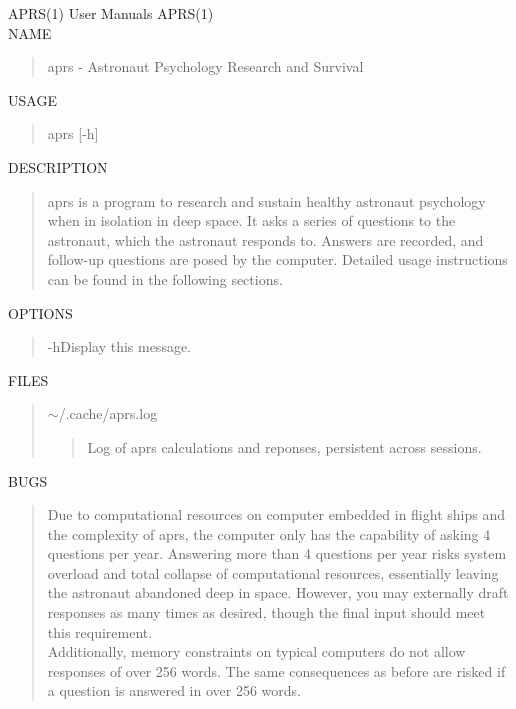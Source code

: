 \documentclass{article}
\begin{document}
\noindent APRS(1) \hfill User Manuals \hfill APRS(1) \\

NAME
\begin{quote}aprs - Astronaut Psychology Research and Survival\end{quote}

USAGE
\begin{quote}
aprs [-h]
\end{quote}

DESCRIPTION
\begin{quote}
  aprs is a program to research and sustain healthy astronaut psychology when in isolation in deep space. It asks a series of questions to the astronaut, which the astronaut responds to. Answers are recorded, and follow-up questions are posed by the computer. Detailed usage instructions can be found in the following sections.
\end{quote}

OPTIONS
\begin{quote}
  -h\qquad Display this message.
\end{quote}

FILES
\begin{quote}
  $\sim$/.cache/aprs.log
  \begin{quote}
    Log of aprs calculations and reponses, persistent across sessions.
  \end{quote}
\end{quote}

BUGS
\begin{quote}
  Due to computational resources on computer embedded in flight ships and the complexity of aprs, the computer only has the capability of asking 4 questions per year. Answering more than 4 questions per year risks system overload and total collapse of computational resources, essentially leaving the astronaut abandoned deep in space. However, you may externally draft responses as many times as desired, though the final input should meet this requirement. \\
  
  Additionally, memory constraints on typical computers do not allow responses of over 256 words. The same consequences as before are risked if a question is answered in over 256 words.
\end{quote}
\end{document}
